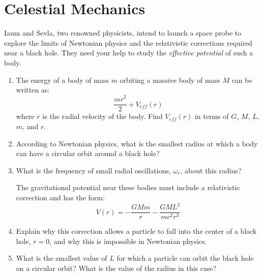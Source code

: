 \documentclass[11pt]{article}
\begin{document}
\section{Celestial Mechanics}
\begin{pproblem}
    Iaum and Sevla, two renowned physicists, intend to launch a space probe to explore the limits of Newtonian physics and the relativistic corrections required near a black hole. They need your help to study the \textit{effective potential} of such a body.
    \begin{enumerate}[label=\textbf{\alph*)}]
        \item The energy of a body of mass \(m\) orbiting a massive body of mass \(M\) can be written as:
             \[
             \frac{m\dot r ^2}{2} + V_{eff}(r)
             \]
             where \(\dot r\) is the radial velocity of the body. Find \(V_{eff}(r)\) in terms of \(G\), \(M\), \(L\), \(m\), and \(r\).

        \item According to Newtonian physics, what is the smallest radius at which a body can have a circular orbit around a black hole?
    
        \item What is the frequency of small radial oscillations, \(\omega_r\), about this radius?

        The gravitational potential near these bodies must include a relativistic correction and has the form:
        \[
        V(r) = -\frac{GMm}{r} - \frac{GML^2}{mc^2r^3}
        \]

        \item Explain why this correction allows a particle to fall into the center of a black hole, \(r=0\), and why this is impossible in Newtonian physics.
        
        \item What is the smallest value of \(L\) for which a particle can orbit the black hole on a circular orbit? What is the value of the radius in this case?
        

\end{enumerate}
\end{pproblem}
\end{document}
